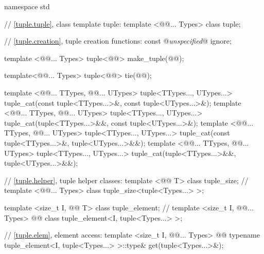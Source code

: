\documentclass[american,twoside]{book}
\begin{document}
\pnum
{}

%
\begin{codeblock}
namespace std {
  // \ref{tuple.tuple}, class template tuple:
  template <@@... Types> class tuple;

  // \ref{tuple.creation}, tuple creation functions:
  const @\textit{unspecified}@ ignore;

  template <@@... Types>
    tuple<@@> make_tuple(@@);

  template<@@... Types>
    tuple<@@> tie(@@); 

  template <@@... TTypes, @@... UTypes>
    tuple<TTypes..., UTypes...> tuple_cat(const tuple<TTypes...>&, const tuple<UTypes...>&);
  template <@@... TTypes, @@... UTypes>
    tuple<TTypes..., UTypes...> tuple_cat(tuple<TTypes...>&&, const tuple<UTypes...>&);
  template <@@... TTypes, @@... UTypes>
    tuple<TTypes..., UTypes...> tuple_cat(const tuple<TTypes...>&, tuple<UTypes...>&&);
  template <@@... TTypes, @@... UTypes>
    tuple<TTypes..., UTypes...> tuple_cat(tuple<TTypes...>&&, tuple<UTypes...>&&);

  // \ref{tuple.helper}, tuple helper classes:
  template <@@ T> class tuple_size;  // 
  template <@@... Types> class tuple_size<tuple<Types...> >;

  template <size_t I, @@ T> class tuple_element;    // 
  template <size_t I, @@... Types>
    @@ class tuple_element<I, tuple<Types...> >;

  // \ref{tuple.elem}, element access:
  template <size_t I, @@... Types> 
    @@
    typename tuple_element<I, tuple<Types...> >::type& get(tuple<Types...>&);

}
\end{codeblock}
\end{document}
